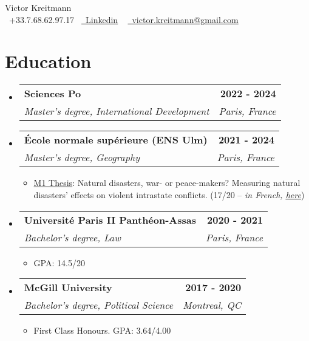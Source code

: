 \documentclass[a4paper,11pt]{article}
\makeatletter
\newcommand{\resumeItem}[1]{
  \item\small{
    {#1 \vspace{-2pt}}
  }
}
\newcommand{\resumeSubheading}[4]{
  \vspace{-2pt}\item
    \begin{tabular*}{1.00\textwidth}[t]{l@{\extracolsep{\fill}}r}
      \textbf{{\small #1}} & {{\textbf{\small #2}}} \\
      \textit{\small#3} & \textit{\small #4} \\
    \end{tabular*}\vspace{-7pt}
}
\newcommand{\resumeSubHeadingListStart}{\begin{itemize}[leftmargin=0.0in, label={}]}
\newcommand{\resumeSubHeadingListEnd}{\end{itemize}}
\newcommand{\resumeItemListStart}{\begin{itemize}}
\newcommand{\resumeItemListEnd}{\end{itemize}\vspace{-5pt}}
\makeatother
\begin{document}

\begin{center}
    {\Huge \upshape Victor Kreitmann} \\ \vspace{1pt}
    \small \raisebox{-0.1\height}\faPhone\ +33.7.68.62.97.17~
    \href{https://www.linkedin.com/in/victor-kreitmann/}{\raisebox{-0.2\height}\faLinkedin\ \underline{Linkedin}}  ~    
    \href{mailto:victor.kreitmann@gmail.com}{\raisebox{-0.2\height}\faEnvelope\  \underline{victor.kreitmann@gmail.com}} ~ 
    \vspace{0pt}
\end{center}




\section{Education}
  \resumeSubHeadingListStart
    \resumeSubheading
      {Sciences Po}{2022 - 2024}
      {Master's degree, International Development}{Paris, France}
      
      \resumeSubheading
      {École normale supérieure (ENS Ulm)}{2021 - 2024}
      {Master's degree, Geography}{Paris, France}
      \resumeItemListStart
      \resumeItem{\underline{M1 Thesis}: Natural disasters, war- or peace-makers? Measuring natural disasters' effects on violent intrastate conflicts. (17/20 – \emph{in French, \href{https://drive.google.com/file/d/1O6ke_2wZjExpSnBBnSKN7shPb0E3ZBgg/view?usp=sharing}{\underline{here}}})}
      \resumeItemListEnd
      
      \resumeSubheading
      {Université Paris II Panthéon-Assas}{2020 - 2021}
      {Bachelor's degree, Law}{Paris, France}
      \resumeItemListStart
      \resumeItem{GPA: 14.5/20}
      \resumeItemListEnd
      
      \resumeSubheading
      {McGill University}{2017 - 2020}
      {Bachelor's degree, Political Science}{Montreal, QC}
      \resumeItemListStart
      \resumeItem{First Class Honours. GPA: 3.64/4.00}
      \resumeItemListEnd
  \resumeSubHeadingListEnd
\vspace{-10pt}
\end{document}
